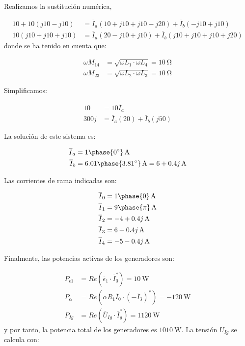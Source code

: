 \documentclass[12pt]{article}
\begin{document}
Realizamos la sustitución numérica, 

\begin{align*}
  10 + 10 (j 10 - j 10) &= \overline{I}_a (10 + j 10 + j 10 - j 20) +  \overline{I}_b (-j 10 + j 10)\\
  10 (j 10 + j 10 + j10) &= \overline{I}_a (20 - j 10 + j10) + \overline{I}_b (j 10 + j 10 + j 10 + j 20)
\end{align*}
donde se ha tenido en cuenta que:

\begin{align*}
  \omega M_{14} &= \sqrt{\omega L_1 \cdot \omega L_4} = \SI{10}{\ohm}\\
  \omega M_{23} &= \sqrt{\omega L_2 \cdot \omega L_3} = \SI{10}{\ohm}
\end{align*}

Simplificamos:

\begin{align*}
  10 &= 10 \overline{I}_a\\
  300j &= \overline{I}_a (20) + \overline{I}_b (j 50)
\end{align*}

La solución de este sistema es:

\begin{align*}
  \overline{I}_a &= \SI[parse-numbers=false]{1\phase{\ang{0}}}{\ampere}\\
  \overline{I}_b &= \SI[parse-numbers=false]{6.01\phase{\ang{3.81}}}{\ampere} = \SI[parse-numbers=false]{6 + 0.4j}{\ampere}
\end{align*}

Las corrientes de rama indicadas son:

\begin{align*}
  \overline{I}_0 &= \SI[parse-numbers=false]{1\phase{0}}{\ampere}\\
  \overline{I}_1 &= \SI[parse-numbers=false]{9\phase{\pi}}{\ampere}\\
  \overline{I}_2 &= \SI[parse-numbers=false]{-4 + 0.4j}{\ampere}\\
  \overline{I}_3 &= \SI[parse-numbers=false]{6 + 0.4j}{\ampere}\\
  \overline{I}_4 &= \SI[parse-numbers=false]{-5 - 0.4j}{\ampere}
\end{align*}

Finalmente, las potencias activas de los generadores son:

\begin{align*}
  P_{\epsilon1} &= Re(\overline{\epsilon}_1 \cdot \overline{I}_0^*) = \SI{10}{\watt}\\
  P_{\alpha} &= Re(\alpha R_1 \overline{I}_0 \cdot (-\overline{I}_3)^*) = \SI{-120}{\watt}\\
  P_{Ig} &= Re(\overline{U}_{Ig} \cdot \overline{I}_g^*) = \SI{1120}{\watt}
\end{align*}
y por tanto, la potencia total de los generadores es $\SI{1010}{\watt}$. La tensión $U_{Ig}$ se calcula con:
\end{document}
